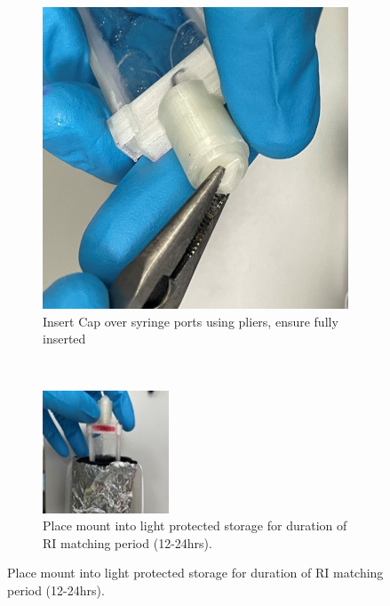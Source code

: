 \clearpage

\begin{figure}[H]
    \addtocounter{figure}{-1}

\begin{subfigure}{.4\linewidth}
\addtocounter{subfigure}{10}
  \includegraphics[width=\linewidth]{Images/Step11.jpg}
  \caption{Insert Cap over syringe ports using pliers, ensure fully inserted}
  \label{velcomp}
\end{subfigure}\hfill 
~
\medskip
\begin{subfigure}{.4\linewidth}
  \includegraphics[width=\linewidth]{Images/Step12.jpg}
  \caption{Place mount into light protected storage for duration of RI matching period (12-24hrs).}
  \label{estcomp}
\end{subfigure}\hfill 


\end{figure}
